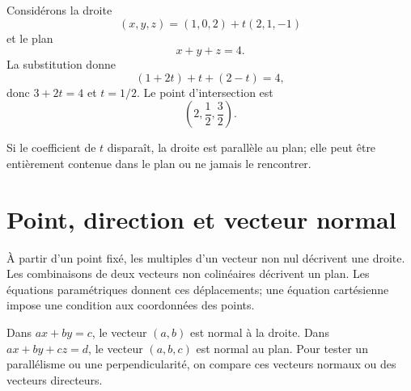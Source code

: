 \begin{examplebox}
Considérons la droite
\[
(x,y,z)=(1,0,2)+t(2,1,-1)
\]
et le plan
\[
x+y+z=4.
\]
La substitution donne
\[
(1+2t)+t+(2-t)=4,
\]
donc $3+2t=4$ et $t=1/2$. Le point d'intersection est
\[
\left(2,\frac12,\frac32\right).
\]
\end{examplebox}

Si le coefficient de $t$ disparaît, la droite est parallèle au plan; elle peut être entièrement contenue dans le plan ou ne jamais le rencontrer.


\section{Point, direction et vecteur normal}
\label{manual:section:10.06}

\begin{visualbox}
À partir d'un point fixé, les multiples d'un vecteur non nul décrivent une droite. Les combinaisons de deux vecteurs non colinéaires décrivent un plan. Les équations paramétriques donnent ces déplacements; une équation cartésienne impose une condition aux coordonnées des points.
\end{visualbox}

\begin{center}
\qquad
{}
\end{center}

\begin{connectionbox}
Dans $ax+by=c$, le vecteur $(a,b)$ est normal à la droite. Dans $ax+by+cz=d$, le vecteur $(a,b,c)$ est normal au plan. Pour tester un parallélisme ou une perpendicularité, on compare ces vecteurs normaux ou des vecteurs directeurs.
\end{connectionbox}

